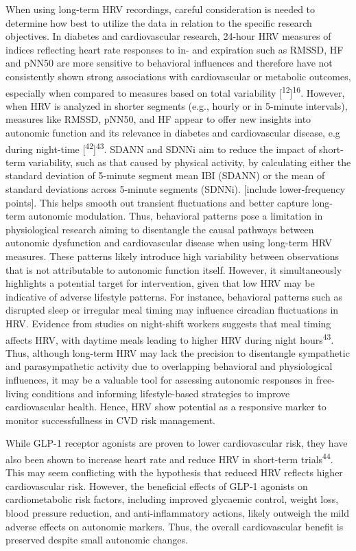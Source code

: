 \documentclass[
  a4paper,
  headsepline=true,
  open=any]{scrbook}
\begin{document}
When using long-term HRV recordings, careful consideration is needed to
determine how best to utilize the data in relation to the specific
research objectives. In diabetes and cardiovascular research, 24-hour
HRV measures of indices reflecting heart rate responses to in- and
expiration such as RMSSD, HF and pNN50 are more sensitive to behavioral
influences and therefore have not consistently shown strong associations
with cardiovascular or metabolic outcomes, especially when compared to
measures based on total variability
{[}\textsuperscript{12}{]}\textsuperscript{16}. However, when HRV is
analyzed in shorter segments (e.g., hourly or in 5-minute intervals),
measures like RMSSD, pNN50, and HF appear to offer new insights into
autonomic function and its relevance in diabetes and cardiovascular
disease, e.g during night-time
{[}\textsuperscript{42}{]}\textsuperscript{43}. SDANN and SDNNi aim to
reduce the impact of short-term variability, such as that caused by
physical activity, by calculating either the standard deviation of
5-minute segment mean IBI (SDANN) or the mean of standard deviations
across 5-minute segments (SDNNi). {[}include lower-frequency points{]}.
This helps smooth out transient fluctuations and better capture
long-term autonomic modulation. Thus, behavioral patterns pose a
limitation in physiological research aiming to disentangle the causal
pathways between autonomic dysfunction and cardiovascular disease when
using long-term HRV measures. These patterns likely introduce high
variability between observations that is not attributable to autonomic
function itself. However, it simultaneously highlights a potential
target for intervention, given that low HRV may be indicative of adverse
lifestyle patterns. For instance, behavioral patterns such as disrupted
sleep or irregular meal timing may influence circadian fluctuations in
HRV. Evidence from studies on night-shift workers suggests that meal
timing affects HRV, with daytime meals leading to higher HRV during
night hours\textsuperscript{43}. Thus, although long-term HRV may lack
the precision to disentangle sympathetic and parasympathetic activity
due to overlapping behavioral and physiological influences, it may be a
valuable tool for assessing autonomic responses in free-living
conditions and informing lifestyle-based strategies to improve
cardiovascular health. Hence, HRV show potential as a responsive marker
to monitor successfullness in CVD risk management.

While GLP-1 receptor agonists are proven to lower cardiovascular risk,
they have also been shown to increase heart rate and reduce HRV in
short-term trials\textsuperscript{44}. This may seem conflicting with
the hypothesis that reduced HRV reflects higher cardiovascular risk.
However, the beneficial effects of GLP-1 agonists on cardiometabolic
risk factors, including improved glycaemic control, weight loss, blood
pressure reduction, and anti-inflammatory actions, likely outweigh the
mild adverse effects on autonomic markers. Thus, the overall
cardiovascular benefit is preserved despite small autonomic changes.
\end{document}
